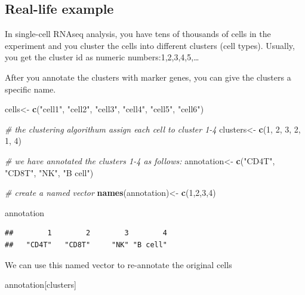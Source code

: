 \documentclass[
]{book}
\newenvironment{Shaded}{\begin{snugshade}}{\end{snugshade}}
\newcommand{\CommentTok}[1]{\textcolor[rgb]{0.56,0.35,0.01}{\textit{#1}}}
\newcommand{\DecValTok}[1]{\textcolor[rgb]{0.00,0.00,0.81}{#1}}
\newcommand{\FunctionTok}[1]{\textcolor[rgb]{0.13,0.29,0.53}{\textbf{#1}}}
\newcommand{\NormalTok}[1]{#1}
\newcommand{\OtherTok}[1]{\textcolor[rgb]{0.56,0.35,0.01}{#1}}
\newcommand{\StringTok}[1]{\textcolor[rgb]{0.31,0.60,0.02}{#1}}
\begin{document}
\hypertarget{real-life-example}{%
\subsection{Real-life example}\label{real-life-example}}

In single-cell RNAseq analysis, you have tens of thousands of cells in the experiment and you cluster the cells into different clusters (cell types). Usually, you get the cluster id as numeric numbers:1,2,3,4,5,\ldots{}

After you annotate the clusters with marker genes, you can give the clusters a specific name.

\begin{Shaded}
\begin{Highlighting}[]
\NormalTok{cells}\OtherTok{\textless{}{-}} \FunctionTok{c}\NormalTok{(}\StringTok{"cell1"}\NormalTok{, }\StringTok{"cell2"}\NormalTok{, }\StringTok{"cell3"}\NormalTok{, }\StringTok{"cell4"}\NormalTok{, }\StringTok{"cell5"}\NormalTok{, }\StringTok{"cell6"}\NormalTok{)}

\CommentTok{\# the clustering algorithum assign each cell to cluster 1{-}4 }
\NormalTok{clusters}\OtherTok{\textless{}{-}} \FunctionTok{c}\NormalTok{(}\DecValTok{1}\NormalTok{, }\DecValTok{2}\NormalTok{, }\DecValTok{3}\NormalTok{, }\DecValTok{2}\NormalTok{, }\DecValTok{1}\NormalTok{, }\DecValTok{4}\NormalTok{)}

\CommentTok{\# we have annotated the clusters 1{-}4 as follows:}
\NormalTok{annotation}\OtherTok{\textless{}{-}} \FunctionTok{c}\NormalTok{(}\StringTok{"CD4T"}\NormalTok{, }\StringTok{"CD8T"}\NormalTok{, }\StringTok{"NK"}\NormalTok{, }\StringTok{"B cell"}\NormalTok{)}

\CommentTok{\# create a named vector}
\FunctionTok{names}\NormalTok{(annotation)}\OtherTok{\textless{}{-}} \FunctionTok{c}\NormalTok{(}\DecValTok{1}\NormalTok{,}\DecValTok{2}\NormalTok{,}\DecValTok{3}\NormalTok{,}\DecValTok{4}\NormalTok{)}

\NormalTok{annotation}
\end{Highlighting}
\end{Shaded}

\begin{verbatim}
##        1        2        3        4 
##   "CD4T"   "CD8T"     "NK" "B cell"
\end{verbatim}

We can use this named vector to re-annotate the original cells

\begin{Shaded}
\begin{Highlighting}[]
\NormalTok{annotation[clusters]}
\end{Highlighting}
\end{Shaded}
\end{document}

